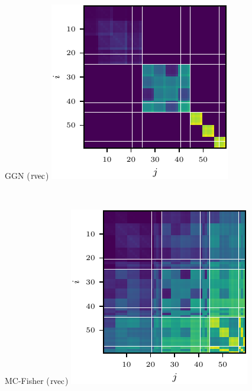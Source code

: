\begin{figure}[t!]
  \begin{minipage}[t]{0.485\linewidth}
    \centering
    GGN ($\operatorname{rvec}$)\vspace{1ex}
    \includegraphics[width=0.8\linewidth]{../kfs/plots/synthetic_rvec_ggn_kfac.pdf}
  \end{minipage}
  \\
  \begin{minipage}[t]{0.485\linewidth}
    \centering
    MC-Fisher ($\operatorname{rvec}$)\vspace{1ex}
    \includegraphics[width=0.8\linewidth]{../kfs/plots/synthetic_rvec_mcfisher_100_full.pdf}
  \end{minipage}

\end{figure}
